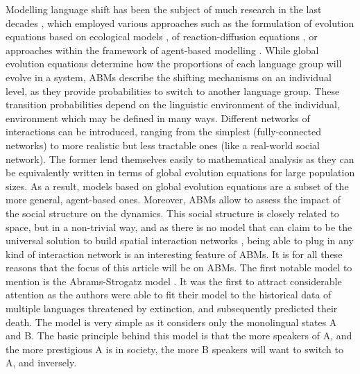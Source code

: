 \documentclass[../thesis.tex]{subfiles}
\begin{document}
Modelling language shift has been the subject of much research in the last decades
\cite{CastellanoStatisticalPhysics2009,BoissonneaultSystematicInterdisciplinary2021},
which employed various approaches such as the formulation of evolution equations based
on ecological models
\cite{MiraInterlinguisticSimilarity2005,PinascoCoexistenceLanguages2006,KandlerEcologicalModels2008,SoleDiversityCompetition2010,HeinsaluRoleBilinguals2014},
of reaction-diffusion equations
\cite{KandlerDemographyLanguage2009,PatriarcaInfluenceGeography2009,IsernLanguageExtinction2014,ProchazkaQuantifyingDriving2017},
or approaches within the framework of agent-based modelling
\cite{CastelloOrderingDynamics2006,MinettModellingEndangered2008,CaridiSchellingvoterModel2013,ProchazkaQuantifyingDriving2017}.
While global evolution equations determine how the proportions of each language group
will evolve in a system, \acp{ABM} describe the shifting mechanisms on
an individual level, as they provide probabilities to switch to another language group.
These transition probabilities depend on the linguistic environment of the individual,
environment which may be defined in many ways. Different networks of interactions can be
introduced, ranging from the simplest (fully-connected networks) to more realistic but
less tractable ones (like a real-world social network). The former lend themselves
easily to mathematical analysis as they can be equivalently written in terms of global
evolution equations for large population sizes. As a result, models based on global
evolution equations are a subset of the more general, agent-based ones. Moreover, \acp{ABM}
allow to assess the impact of the social structure on the dynamics. This social
structure is closely related to space, but in a non-trivial way, and as there is no
model that can claim to be the universal solution to build spatial interaction networks
\cite{BarbosaHumanMobility2018}, being able to plug in any kind of interaction network
is an interesting feature of \acp{ABM}. It is for all these reasons that the focus of this
article will be on \acp{ABM}. The first notable model to mention is the Abrams-Strogatz model
\cite{AbramsModellingDynamics2003}. It was the first to attract considerable attention
as the authors were able to fit their model to the historical data of multiple languages
threatened by extinction, and subsequently predicted their death. The model is very
simple as it considers only the monolingual states A and B. The basic principle behind
this model is that the more speakers of A, and the more prestigious A is in society, the
more B speakers will want to switch to A, and inversely.
\end{document}
